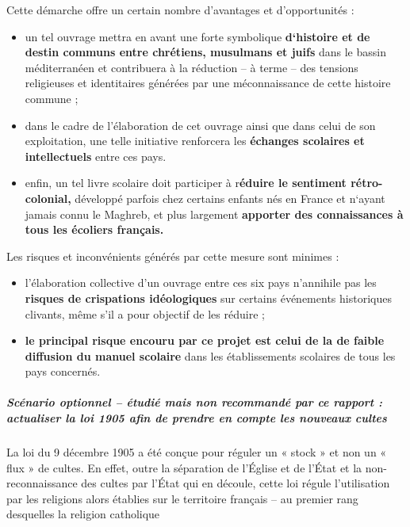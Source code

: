 Cette démarche offre un certain nombre d'avantages et d'opportunités :

\begin{itemize}
\item
  un tel ouvrage mettra en avant une forte symbolique \textbf{d`histoire
  et de destin communs entre chrétiens, musulmans et juifs} dans le
  bassin méditerranéen et contribuera à la réduction -- à terme -- des
  tensions religieuses et identitaires générées par une méconnaissance
  de cette histoire commune ;
\item
  dans le cadre de l'élaboration de cet ouvrage ainsi que dans celui de
  son exploitation, une telle initiative renforcera les \textbf{échanges
  scolaires et intellectuels} entre ces pays.
\item
  enfin, un tel livre scolaire doit participer à r\textbf{éduire le
  sentiment rétro-colonial,} développé parfois chez certains enfants nés
  en France et n`ayant jamais connu le Maghreb, et plus largement
  \textbf{apporter des connaissances à tous les écoliers français.}
\end{itemize}

Les risques et inconvénients générés par cette mesure sont minimes :

\begin{itemize}
\item
  l'élaboration collective d'un ouvrage entre ces six pays n'annihile
  pas les \textbf{risques de crispations idéologiques} sur certains
  événements historiques clivants, même s'il a pour objectif de les
  réduire ;
\item
  \textbf{le principal risque encouru par ce projet est celui de la de
  faible diffusion du manuel scolaire} dans les établissements scolaires
  de tous les pays concernés.
\end{itemize}

\hypertarget{scuxe9nario-optionnel-uxe9tudiuxe9-mais-non-recommanduxe9-par-ce-rapport-actualiser-la-loi-1905-afin-de-prendre-en-compte-les-nouveaux-cultes}{%
\subparagraph{Scénario optionnel -- étudié mais non recommandé par ce
rapport : actualiser la loi 1905 afin de prendre en compte les nouveaux
cultes}\label{scuxe9nario-optionnel-uxe9tudiuxe9-mais-non-recommanduxe9-par-ce-rapport-actualiser-la-loi-1905-afin-de-prendre-en-compte-les-nouveaux-cultes}}


La loi du 9 décembre 1905 a été conçue pour réguler un « stock » et non
un « flux » de cultes. En effet, outre la séparation de l'Église et de
l'État et la non-reconnaissance des cultes par l'État qui en découle,
cette loi régule l'utilisation par les religions alors établies sur le
territoire français -- au premier rang desquelles la religion catholique

